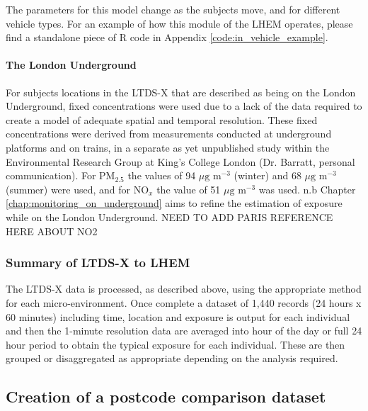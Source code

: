 The parameters for this model change as the subjects move, and for different vehicle types. For an example of how this module of the LHEM operates, please find a standalone piece of R code in Appendix \autoref{code:in_vehicle_example}.
            
            \paragraph{The London Underground}
            \label{sec:the_london_underground}

For subjects locations in the LTDS-X that are described as being on the London Underground, fixed concentrations were used due to a lack of the data required to create a model of adequate spatial and temporal resolution. These fixed concentrations were derived from measurements conducted at underground platforms and on trains, in a separate as yet unpublished study within the Environmental Research Group at King's College London (Dr. Barratt, personal communication). For PM$_{2.5}$ the values of 94 $\mu \text{g m}^{-3}$ (winter) and 68 $\mu \text{g m}^{-3}$ (summer) were used, and for NO$_{x}$ the value of 51 $\mu \text{g m}^{-3}$ was used. n.b Chapter \ref{chap:monitoring_on_underground} aims to refine the estimation of exposure while on the London Underground. NEED TO ADD PARIS REFERENCE HERE ABOUT NO2

        \subsubsection{Summary of LTDS-X to LHEM}
        \label{sec:summary_of_ltdsx_to_lhem}

The LTDS-X data is processed, as described above, using the appropriate method for each micro-environment. Once complete a dataset of 1,440 records (24 hours x 60 minutes) including time, location and exposure is output for each individual and then the 1-minute resolution data are averaged into hour of the day or full 24 hour period to obtain the typical exposure for each individual. These are then grouped or disaggregated as appropriate depending on the analysis required.

    \subsection{Creation of a postcode comparison dataset}
    \label{sec:creating_postcode_dataset}

